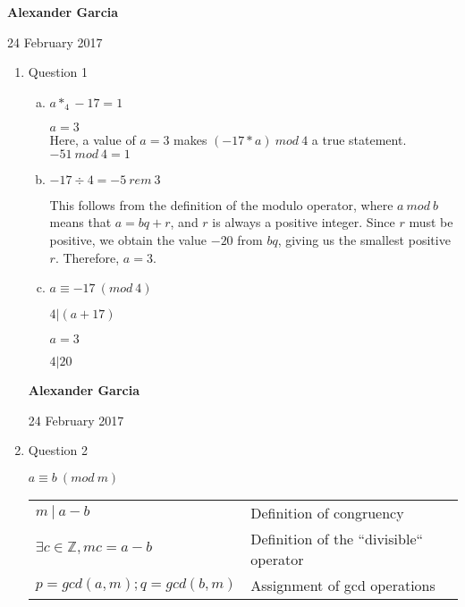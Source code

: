 \documentclass[11pt]{article}
\begin{document}
\textbf{Alexander Garcia}

24 February 2017 \\

\begin{enumerate}

	\item Question 1

		\begin{enumerate}[(a)]

			\item $a *_4 -17 = 1$

			$a = 3$\\

			Here, a value of $a=3$ makes $(-17 * a)\ mod\ 4$ a true statement. $-51\ mod\ 4 = 1$ \\


			\item $-17 \div 4 = -5\ rem\ 3$

			This follows from the definition of the modulo operator, where $a\ mod\ b$
			means that $a = bq + r$, and $r$ is always a positive integer. Since $r$ must
			be positive, we obtain the value $-20$ from $bq$, giving us the smallest positive $r$.
			Therefore, $a = 3$. \\

			\item $a \equiv -17\ (mod\ 4)$

			$4 | (a+17)$

			$a = 3$

			$4 | 20$ \\

		\end{enumerate}

	\newpage

	\textbf{Alexander Garcia}	

	24 February 2017 \\

	\item Question 2
		
		$a \equiv b\ (mod\ m)$ 

		\begin{tabular}{ll}
			$m\ |\ a-b$ & Definition of congruency \\

			$\exists c \in \mathbb{Z}, mc = a-b$ & Definition of the ``divisible`` operator \\ 

			$p = gcd(a,m); q = gcd(b,m)$ & Assignment of gcd operations \\


\end{tabular}
\end{enumerate}
\end{document}
